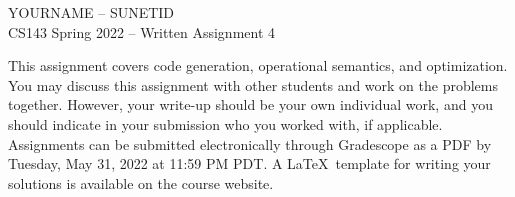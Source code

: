 \documentclass[11pt]{article}
\begin{document}
\begin{center}
\LARGE YOURNAME -- SUNETID \\
\LARGE CS143 Spring 2022 -- Written Assignment 4 \\
\end{center}

This assignment covers code generation, operational semantics, and optimization. You may discuss this assignment with other students and work on the problems together. However, your write-up should be your own individual work, and you should indicate in your submission who you worked with, if applicable. Assignments can be submitted electronically through Gradescope as a PDF by Tuesday, May 31, 2022 at 11:59 PM PDT. A \LaTeX \ template for writing your solutions is available on the course website.

\bigskip
\end{document}
